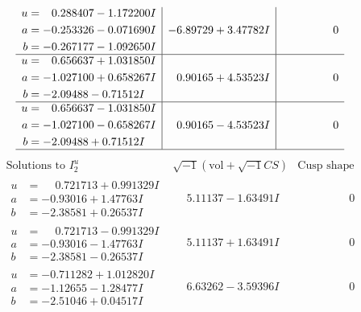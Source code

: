 \documentclass[1p]{elsarticle_modified}
\theoremstyle{definition}
\newcommand{\I}{\sqrt{-1}}
\begin{document}
$$\begin{array}{c|c|c}
\begin{aligned}
u &= \phantom{-}0.288407 - 1.172200 I \\
a &= -0.253326 - 0.071690 I \\
b &= -0.267177 - 1.092650 I\end{aligned}
 & -6.89729 + 3.47782 I & \phantom{-0.000000 } 0 \\ \hline\begin{aligned}
u &= \phantom{-}0.656637 + 1.031850 I \\
a &= -1.027100 + 0.658267 I \\
b &= -2.09488 - 0.71512 I\end{aligned}
 & \phantom{-}0.90165 + 4.53523 I & \phantom{-0.000000 } 0 \\ \hline\begin{aligned}
u &= \phantom{-}0.656637 - 1.031850 I \\
a &= -1.027100 - 0.658267 I \\
b &= -2.09488 + 0.71512 I\end{aligned}
 & \phantom{-}0.90165 - 4.53523 I & \phantom{-0.000000 } 0\\
 \hline 
 \end{array}$$\newpage$$\begin{array}{c|c|c}  
\text{Solutions to }I^u_{2}& \I (\text{vol} + \sqrt{-1}CS) & \text{Cusp shape}\\
 \hline 
\begin{aligned}
u &= \phantom{-}0.721713 + 0.991329 I \\
a &= -0.93016 + 1.47763 I \\
b &= -2.38581 + 0.26537 I\end{aligned}
 & \phantom{-}5.11137 - 1.63491 I & \phantom{-0.000000 } 0 \\ \hline\begin{aligned}
u &= \phantom{-}0.721713 - 0.991329 I \\
a &= -0.93016 - 1.47763 I \\
b &= -2.38581 - 0.26537 I\end{aligned}
 & \phantom{-}5.11137 + 1.63491 I & \phantom{-0.000000 } 0 \\ \hline\begin{aligned}
u &= -0.711282 + 1.012820 I \\
a &= -1.12655 - 1.28477 I \\
b &= -2.51046 + 0.04517 I\end{aligned}
 & \phantom{-}6.63262 - 3.59396 I & \phantom{-0.000000 } 0 \\ \hline\begin{aligned}

\end{aligned}
\end{array}$$
\end{document}
